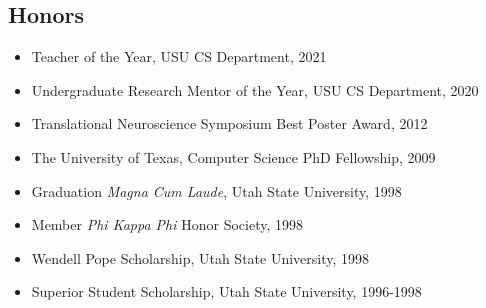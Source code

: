 \documentclass[margin,line]{res}
\begin{document}
\begin{resume}
%
%
%
%
%
%
%
%
%
%
%
%
%
%
\section{\sc Honors}
\begin{itemize}[label={},leftmargin=0pt]
  \setlength\itemsep{0em}
  \item Teacher of the Year, USU CS Department, 2021
  \item Undergraduate Research Mentor of the Year, USU CS Department, 2020
  \item Translational Neuroscience Symposium Best Poster Award, 2012 %
  \item The University of Texas, Computer Science PhD Fellowship, 2009 %
  \item Graduation \emph{Magna Cum Laude}, Utah State University, 1998
  \item Member \emph{Phi Kappa Phi} Honor Society, 1998
  \item Wendell Pope Scholarship, Utah State University, 1998
  \item Superior Student Scholarship, Utah State University, 1996-1998
\end{itemize}


\end{resume}
\end{document}
